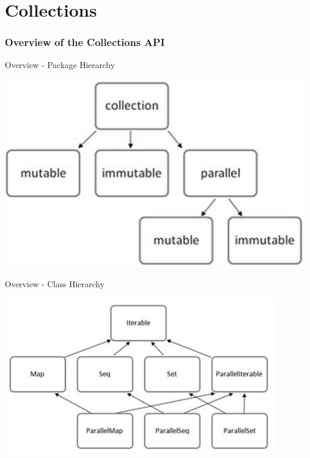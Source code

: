 \part[Collections]{Collections}
\section{Overview of the Collections API}
\begin{frame}{Overview - Package Hierarchy}
\begin{center}
\includegraphics{resources/PackageHierarchy.jpg}
\end{center}
\end{frame}

\begin{frame}{Overview - Class Hierarchy}
\begin{center}
\includegraphics[width = 0.9\textwidth]{resources/ClassHierarchy.jpg}
\end{center}
\end{frame}

